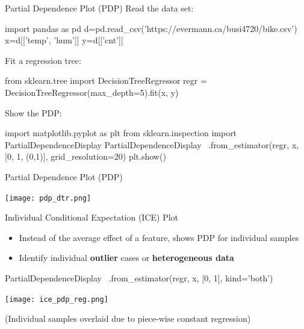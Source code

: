 \documentclass[ignorenonframetext,xcolor=x11names]{beamer}
\begin{document}
\begin{frame}[fragile]{Partial Dependence Plot (PDP)}
Read the data set:
\begin{pythoncode}
import pandas as pd
d=pd.read_csv('https://evermann.ca/busi4720/bike.csv')
x=d[['temp', 'hum']]
y=d[['cnt']]
\end{pythoncode}
Fit a regression tree:
\begin{pythoncode}
from sklearn.tree import DecisionTreeRegressor
regr = DecisionTreeRegressor(max_depth=5).fit(x, y)
\end{pythoncode}
Show the PDP:
\begin{pythoncode}
import matplotlib.pyplot as plt
from sklearn.inspection import PartialDependenceDisplay
PartialDependenceDisplay \
    .from_estimator(regr, x, [0, 1, (0,1)],
        grid_resolution=20)
plt.show()
\end{pythoncode}
\end{frame}

\begin{frame}{Partial Dependence Plot (PDP)}
\begin{center}
\texttt{[image: pdp\_dtr.png]}
\end{center}
\end{frame}

\begin{frame}[fragile]{Individual Conditional Expectation (ICE) Plot}
\begin{itemize}
\item Instead of the average effect of a feature, shows PDP for individual samples
\item Identify individual \textbf{outlier} cases or \textbf{heterogeneous data}
\end{itemize} 
\begin{pythoncode}
PartialDependenceDisplay \
    .from_estimator(regr, x, [0, 1], kind='both')
\end{pythoncode}
\begin{center}
\texttt{[image: ice\_pdp\_reg.png]}
\end{center}

\footnotesize (Individual samples overlaid due to piece-wise constant regression)
\end{frame}
\end{document}
